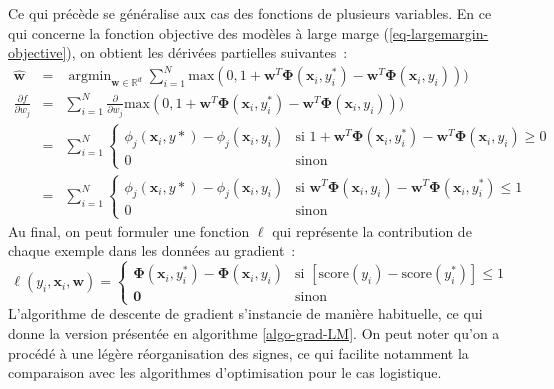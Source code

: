 \documentclass[11pt,openany]{book}
\begin{document}
Ce qui précède se généralise aux cas des fonctions de plusieurs variables.
En ce qui concerne la fonction objective des
modèles à large marge (\ref{eq-largemargin-objective}), on obtient les
dérivées partielles suivantes~:
\begin{eqnarray}
\hat{\mathbf{w}}&=&\mathop{\text{argmin}}_{\mathbf{w} \in \mathbb{R}^d}\sum_{i=1}^N
\text{max}(0,
1+\mathbf{w}^T\boldsymbol\Phi(\mathbf{x}_i,y^*_i) - \mathbf{w}^T\boldsymbol\Phi(\mathbf{x}_i,y_i) ))\\
\nonumber
\frac{\partial f}{\partial w_j} &=&\sum_{i=1}^N
\frac{\partial}{\partial w_j} \text{max}(0,
1+\mathbf{w}^T\boldsymbol\Phi(\mathbf{x}_i,y^*_i) -
\mathbf{w}^T\boldsymbol\Phi(\mathbf{x}_i,y_i) ))\\
\nonumber
&=&\sum_{i=1}^N
\left\{
\begin{array}{ll}
\phi_j(\mathbf{x}_i,y*) - \phi_j(\mathbf{x}_i,y_i) & \text{si }  1+\mathbf{w}^T\boldsymbol\Phi(\mathbf{x}_i,y^*_i) -
\mathbf{w}^T\boldsymbol\Phi(\mathbf{x}_i,y_i)  \geq 0\\
0&\text{sinon}
\end{array}\right.\\
&=&\sum_{i=1}^N
\left\{
\begin{array}{ll}
\phi_j(\mathbf{x}_i,y*) - \phi_j(\mathbf{x}_i,y_i) & \text{si }  
\mathbf{w}^T\boldsymbol\Phi(\mathbf{x}_i,y_i)   - \mathbf{w}^T\boldsymbol\Phi(\mathbf{x}_i,y^*_i) \leq 1\\
0&\text{sinon}
\end{array}\right.
\end{eqnarray}
Au final, on peut formuler une fonction $\ell$ qui représente 
la contribution de chaque exemple dans les données au gradient~:
\begin{displaymath}
\ell(y_i,\mathbf{x}_i,\mathbf{w}) = 
\left\{
\begin{array}{ll}
 \boldsymbol\Phi(\mathbf{x}_i,{y}^*_i)-
\boldsymbol\Phi(\mathbf{x}_{i},y_i)&\text{si }
[ \text{score}(y_i) - \text{score}(y^*_i)  ]\leq 1\\
 \mathbf{0}& \text{sinon}
\end{array}\right.
\end{displaymath}
L'algorithme de descente de gradient s'instancie de manière
habituelle,
ce qui donne la version présentée en algorithme \ref{algo-grad-LM}.
On peut noter qu'on a procédé à une légère réorganisation des signes, ce
qui facilite notamment la comparaison avec les algorithmes
d'optimisation pour le cas logistique.
\end{document}
